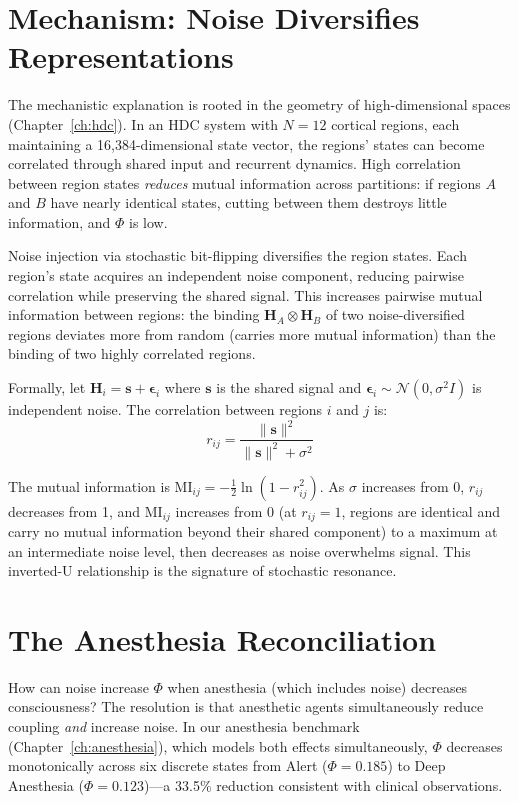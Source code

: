 \documentclass[12pt]{book}
\newcommand{\bind}{\otimes}
\begin{document}
\section{Mechanism: Noise Diversifies Representations}

The mechanistic explanation is rooted in the geometry of high-dimensional spaces (Chapter~\ref{ch:hdc}). In an HDC system with $N = 12$ cortical regions, each maintaining a 16,384-dimensional state vector, the regions' states can become correlated through shared input and recurrent dynamics. High correlation between region states \textit{reduces} mutual information across partitions: if regions $A$ and $B$ have nearly identical states, cutting between them destroys little information, and $\Phi$ is low.

Noise injection via stochastic bit-flipping diversifies the region states. Each region's state acquires an independent noise component, reducing pairwise correlation while preserving the shared signal. This increases pairwise mutual information between regions: the binding $\mathbf{H}_A \bind \mathbf{H}_B$ of two noise-diversified regions deviates more from random (carries more mutual information) than the binding of two highly correlated regions.

Formally, let $\mathbf{H}_i = \mathbf{s} + \boldsymbol{\epsilon}_i$ where $\mathbf{s}$ is the shared signal and $\boldsymbol{\epsilon}_i \sim \mathcal{N}(0, \sigma^2 I)$ is independent noise. The correlation between regions $i$ and $j$ is:
\begin{equation}
r_{ij} = \frac{\|\mathbf{s}\|^2}{\|\mathbf{s}\|^2 + \sigma^2}
\end{equation}

The mutual information is $\text{MI}_{ij} = -\frac{1}{2}\ln(1 - r_{ij}^2)$. As $\sigma$ increases from 0, $r_{ij}$ decreases from 1, and $\text{MI}_{ij}$ increases from 0 (at $r_{ij} = 1$, regions are identical and carry no mutual information beyond their shared component) to a maximum at an intermediate noise level, then decreases as noise overwhelms signal. This inverted-U relationship is the signature of stochastic resonance.

\section{The Anesthesia Reconciliation}

How can noise increase $\Phi$ when anesthesia (which includes noise) decreases consciousness? The resolution is that anesthetic agents simultaneously reduce coupling \textit{and} increase noise. In our anesthesia benchmark (Chapter~\ref{ch:anesthesia}), which models both effects simultaneously, $\Phi$ decreases monotonically across six discrete states from Alert ($\Phi = 0.185$) to Deep Anesthesia ($\Phi = 0.123$)---a 33.5\% reduction consistent with clinical observations.
\end{document}
